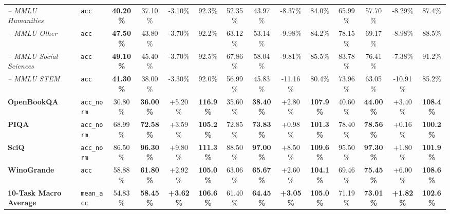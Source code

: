 \documentclass[twocolumn,10pt]{article}
\begin{document}
\begin{table}[!htbp]
{\begin{tabular}{llcccccccccccc}
\textit{-- MMLU Humanities} & \texttt{acc} & \textbf{40.20\%} & 37.10\% & -3.10\% & 92.3\% & 52.35\% & 43.97\% & -8.37\% & 84.0\% & 65.99\% & 57.70\% & -8.29\% & 87.4\% \\
\textit{-- MMLU Other} & \texttt{acc} & \textbf{47.50\%} & 43.80\% & -3.70\% & 92.2\% & 63.12\% & 53.14\% & -9.98\% & 84.2\% & 78.15\% & 69.17\% & -8.98\% & 88.5\% \\
\textit{-- MMLU Social Sciences} & \texttt{acc} & \textbf{49.10\%} & 45.40\% & -3.70\% & 92.5\% & 67.86\% & 58.04\% & -9.81\% & 85.5\% & 83.78\% & 76.41\% & -7.38\% & 91.2\% \\
\textit{-- MMLU STEM} & \texttt{acc} & \textbf{41.30\%} & 38.00\% & -3.30\% & 92.0\% & 56.99\% & 45.83\% & -11.16\% & 80.4\% & 73.96\% & 63.05\% & -10.91\% & 85.2\% \\
\textbf{OpenBookQA} & \texttt{acc\_norm} & 30.80\% & \textbf{36.00\%} & +5.20\% & \textbf{116.9\%} & 35.60\% & \textbf{38.40\%} & +2.80\% & \textbf{107.9\%} & 40.60\% & \textbf{44.00\%} & +3.40\% & \textbf{108.4\%} \\
\textbf{PIQA} & \texttt{acc\_norm} & 68.99\% & \textbf{72.58\%} & +3.59\% & \textbf{105.2\%} & 72.85\% & \textbf{73.83\%} & +0.98\% & \textbf{101.3\%} & 78.40\% & \textbf{78.56\%} & +0.16\% & \textbf{100.2\%} \\
\textbf{SciQ} & \texttt{acc\_norm} & 86.50\% & \textbf{96.30\%} & +9.80\% & \textbf{111.3\%} & 88.50\% & \textbf{97.00\%} & +8.50\% & \textbf{109.6\%} & 95.50\% & \textbf{97.30\%} & +1.80\% & \textbf{101.9\%} \\
\textbf{WinoGrande} & \texttt{acc} & 58.88\% & \textbf{61.80\%} & +2.92\% & \textbf{105.0\%} & 63.06\% & \textbf{65.67\%} & +2.60\% & \textbf{104.1\%} & 69.46\% & \textbf{75.45\%} & +6.00\% & \textbf{108.6\%} \\
\midrule
\textbf{10-Task Macro Average} & \texttt{mean\_acc} & 54.83\% & \textbf{58.45\%} & \textbf{+3.62\%} & \textbf{106.6\%} & 61.40\% & \textbf{64.45\%} & \textbf{+3.05\%} & \textbf{105.0\%} & 71.19\% & \textbf{73.01\%} & \textbf{+1.82\%} & \textbf{102.6\%} \\
\bottomrule
\end{tabular}%
}
\end{table}
\end{document}
